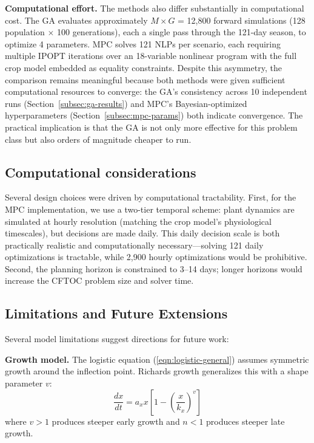 \documentclass[pdflatex,sn-mathphys-num]{sn-jnl}
\newcommand{\df}[2]{\displaystyle\frac{#1}{#2}}
\begin{document}
\textbf{Computational effort.} The methods also differ substantially in computational cost. The GA evaluates approximately $M \times G$ = 12,800 forward simulations (128 population $\times$ 100 generations), each a single pass through the 121-day season, to optimize 4 parameters. MPC solves 121 NLPs per scenario, each requiring multiple IPOPT iterations over an 18-variable nonlinear program with the full crop model embedded as equality constraints. Despite this asymmetry, the comparison remains meaningful because both methods were given sufficient computational resources to converge: the GA's consistency across 10 independent runs (Section~\ref{subsec:ga-results}) and MPC's Bayesian-optimized hyperparameters (Section~\ref{subsec:mpc-params}) both indicate convergence. The practical implication is that the GA is not only more effective for this problem class but also orders of magnitude cheaper to run.

\subsection{Computational considerations}\label{subsec:compute}

Several design choices were driven by computational tractability. First, for the MPC implementation, we use a two-tier temporal scheme: plant dynamics are simulated at hourly resolution (matching the crop model's physiological timescales), but decisions are made daily. This daily decision scale is both practically realistic and computationally necessary---solving 121 daily optimizations is tractable, while 2,900 hourly optimizations would be prohibitive. Second, the planning horizon is constrained to 3--14 days; longer horizons would increase the CFTOC problem size and solver time.

\subsection{Limitations and Future Extensions}\label{subsec:future-work}

Several model limitations suggest directions for future work:

\textbf{Growth model.} The logistic equation (\ref{eqn:logistic-general}) assumes symmetric growth around the inflection point. Richards growth generalizes this with a shape parameter $v$:
\begin{equation}
\df{dx}{dt} = a_{x}x\left[ 1 - \left( \df{x}{k_{x}} \right)^{v} \right]
\label{eqn:richards-growth}
\end{equation}
where $v > 1$ produces steeper early growth and $n < 1$ produces steeper late growth.
\end{document}
